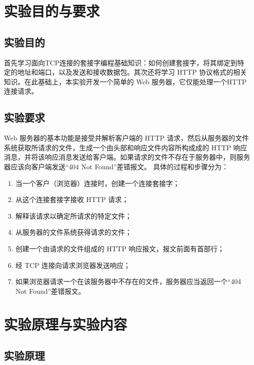 \documentclass[UTF8,12pt]{article}
\begin{document}
\begin{center}
    \tableofcontents
\end{center}
\newpage

\section{实验目的与要求}
\subsection{实验目的}
首先学习面向TCP连接的套接字编程基础知识：如何创建套接字，将其绑定到特定的地址和端口，以及发送和接收数据包。其次还将学习 HTTP 协议格式的相关知识。在此基础上，本实验开发一个简单的 Web 服务器，它仅能处理一个HTTP连接请求。
\subsection{实验要求}
Web 服务器的基本功能是接受并解析客户端的 HTTP 请求，然后从服务器的文件系统获取所请求的文件，生成一个由头部和响应文件内容所构成成的 HTTP 响应消息，并将该响应消息发送给客户端。如果请求的文件不存在于服务器中，则服务器应该向客户端发送“404 Not Found”差错报文。 具体的过程和步骤分为：
\begin{enumerate}
    \item 当一个客户（浏览器）连接时，创建一个连接套接字；
    \item 从这个连接套接字接收 HTTP 请求； 
    \item 解释该请求以确定所请求的特定文件； 
    \item 从服务器的文件系统获得请求的文件；
    \item 创建一个由请求的文件组成的 HTTP 响应报文，报文前面有首部行； 
    \item 经 TCP 连接向请求浏览器发送响应；
    \item 如果浏览器请求一个在该服务器中不存在的文件，服务器应当返回一个“404 Not Found”差错报文。
\end{enumerate}

\section{实验原理与实验内容}
\subsection{实验原理}
\end{document}

